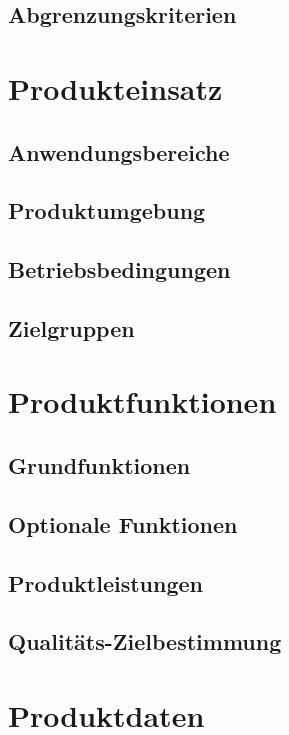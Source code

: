 \documentclass[a4paper]{scrreprt}
\begin{document}
        \section{Abgrenzungskriterien}

    \chapter{Produkteinsatz}
        \section{Anwendungsbereiche}
        
        \section{Produktumgebung}

        \section{Betriebsbedingungen}
        
        \section{Zielgruppen}

    \chapter{Produktfunktionen}
    		\section{Grundfunktionen}
    		
    		\section{Optionale Funktionen}
    		
    		\section{Produktleistungen}
    		
    		\section{Qualitäts-Zielbestimmung}

    \chapter{Produktdaten}
    
\end{document}
